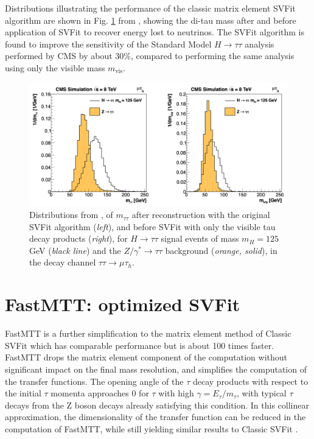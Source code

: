 Distributions illustrating the performance of the classic matrix element SVFit algorithm are shown in Fig. \ref{fig:classic_svfit_resolution} from \cite{2014_SVFit_Bianchini}, showing the di-tau mass after and before application of SVFit to recover energy lost to neutrinos. The SVFit algorithm is found to improve the sensitivity of the Standard Model $H \rightarrow \tau\tau$ analysis performed by CMS by about 30\%, compared to performing the same analysis using only the visible mass $m_{\text{vis}}$. 

\begin{figure}[ht]
    \centering
    \includegraphics[width=15cm]{figures/ch-12-signal-extraction-statistical-fitting/original_SVFit_resolution_2014_SVFit_Bianchini.png}
    \caption[Distributions of $m_{\tau\tau}$ reconstructed by the classic SVFit algorithm, and masses of visible tau decay products (before SVFit).]{Distributions from \cite{2014_SVFit_Bianchini}, of $m_{\tau\tau}$ after reconstruction with the original SVFit algorithm (\textit{left}), and before SVFit with only the visible tau decay products (\textit{right}), for $H \rightarrow \tau\tau$ signal events of mass $m_H = 125$ GeV (\textit{black line}) and the $Z/\gamma^* \rightarrow \tau\tau$ background (\textit{orange, solid}), in the decay channel $\tau\tau \rightarrow \mu\tau_{h}$.} 
    \label{fig:classic_svfit_resolution}
\end{figure}


\section{FastMTT: optimized SVFit}
FastMTT \cite{CMS-AN-19-032-FastMTT} is a further simplification to the matrix element method of Classic SVFit which has comparable performance but is about 100 times faster. FastMTT drops the matrix element component of the computation without significant impact on the final mass resolution, and simplifies the computation of the transfer functions. The opening angle of the $\tau$ decay products with respect to the initial $\tau$ momenta approaches 0 for $\tau$ with high $\gamma = E_{\tau}/m_{\tau}$, with typical $\tau$ decays from the Z boson decays already satisfying this condition. In this collinear approximation, the dimensionality of the transfer function can be reduced in the computation of FastMTT, while still yielding similar results to Classic SVFit \cite{CMS-AN-19-032-FastMTT}. 

